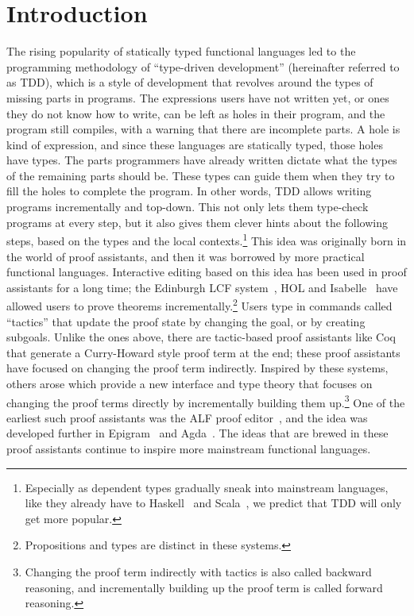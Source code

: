 \chapter{Introduction} \label{chap:introduction}

The rising popularity of statically typed functional languages led to
the programming methodology of ``type-driven development'' (hereinafter referred to as TDD),
which is a style of development that revolves around the types of missing parts in
programs. The expressions users have not written yet, or ones they do not know
how to write, can be left as holes in their program, and the program still
compiles, with a warning that there are incomplete parts.
A hole is kind of expression, and since these languages are
statically typed, those holes have types. The parts
programmers have already written dictate what the types of the remaining parts should
be. These types can guide them when they try to fill the holes to complete the program.
In other words, TDD allows writing programs incrementally and top-down. This
not only lets them type-check programs at every step, but it also gives them clever
hints about the following steps, based on the types and the local
contexts.\footnote{Especially as dependent types gradually sneak into
mainstream languages, like they already have to Haskell~\cite{eisenberg} and
Scala~\cite{scalaDep}, we predict that TDD will only get more popular.}
This idea was originally born in the world of proof assistants, and then it was
borrowed by more practical functional languages.
Interactive editing based on this idea has been used in proof assistants for a long
time; the Edinburgh LCF system~\cite{lcf}, HOL and
Isabelle~\cite{isabelle} have allowed users to prove theorems
incrementally.\footnote{Propositions and types are distinct in these systems.}
Users type in commands called ``tactics'' that update the proof state by
changing the goal, or by creating subgoals.
Unlike the ones above, there are tactic-based proof assistants like
Coq~\cite{coq} that generate a Curry-Howard style proof term at the end; these
proof assistants have focused on changing the proof term indirectly.
Inspired by these systems, others arose which
provide a new interface and type theory that focuses on
changing the proof terms directly by incrementally building them
up.\footnote{Changing the proof term indirectly with tactics is also called
backward reasoning, and incrementally building up the proof term is called
forward reasoning.} One of the earliest such proof assistants was the ALF proof
editor~\cite{ALF}, and the idea was developed further in Epigram~\cite{epigram}
and Agda~\cite{agda}.
The ideas that are brewed in these proof assistants continue to inspire more
mainstream functional languages.

